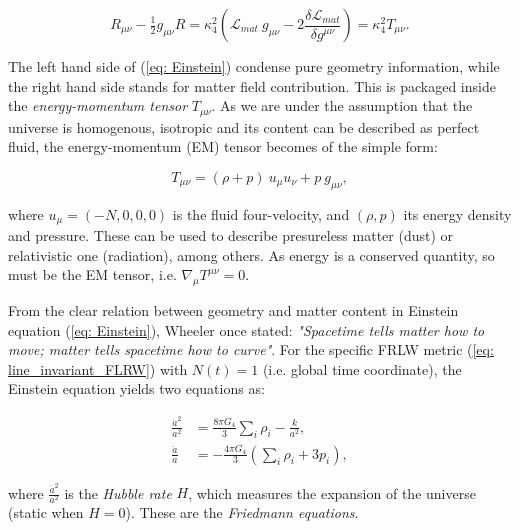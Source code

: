\documentclass[11pt, a4paper]{article} %
\begin{document}
\begin{equation}\label{eq: Einstein}
		R_{\mu\nu} - \tfrac{1}{2} g_{\mu\nu} R = \kappa^{2}_{4} \left(\mathcal{L}_{mat}\: g_{\mu\nu} - 2 \frac{\delta \mathcal{L}_{mat}}{\delta g^{\mu \nu}}\right) = \kappa^{2}_{4} T_{\mu \nu}.
\end{equation}

The left hand side of (\ref{eq: Einstein}) condense pure geometry information, while the right hand side stands for matter field contribution. This is packaged inside the \textit{energy-momentum tensor} $T_{\mu\nu}$. As we are under the assumption that the universe is homogenous, isotropic and its content can be described as perfect fluid, the energy-momentum (EM) tensor becomes of the simple form:

\begin{equation}\label{eq: EMtensor}
	T_{\mu \nu} = (\rho + p) \:u_{\mu}u_{\nu} + p\: g_{\mu\nu},
\end{equation}

where $u_{\mu} = \left(-N, 0, 0, 0\right)$ is the fluid four-velocity, and $(\rho, p)$ its energy density and pressure. These can be used to describe presureless matter (dust) or relativistic one (radiation), among others. As energy is a conserved quantity, so must be the EM tensor, i.e. $\nabla_{\mu}T^{\mu \nu} =0$. 

From the clear relation between geometry and matter content in Einstein equation (\ref{eq: Einstein}), Wheeler once stated: \textit{"Spacetime tells matter how to move; matter tells spacetime how to curve"}. For the specific FRLW metric (\ref{eq: line_invariant_FLRW}) with $N(t) = 1$ (i.e. global time coordinate), the Einstein equation yields two equations as:

\begin{align}
	\label{eq: Friedmann1} \frac{\dot{a}^{2}}{a^{2}} &= \frac{8 \pi G_{4}}{3}\sum_{i} \rho_{i} - \frac{k}{a^{2}},\\
	\label{eq: Friedmann2} \frac{\ddot{a}}{a} &= -\frac{4 \pi G_{4}}{3} \left(\sum_{i} \rho_{i} + 3 p_{i}\right),
\end{align}

where $\frac{\dot{a}^{2}}{a^{2}}$ is the \textit{Hubble rate} $H$, which measures the expansion of the universe (static when $H = 0$). These are the \textit{Friedmann equations}.
\end{document}
